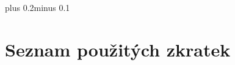 \documentclass[11pt,twoside,a4paper]{book}
\begin{document}

\mainbodystarts
\normalfont
{}\baselineskip plus 0.2\baselineskip minus 0.1\baselineskip



% 
% 









%



%
{
\def\CS{$\cal C\kern-0.1667em\lower.5ex\hbox{$\cal S$}\kern-0.075em $}

}

\appendix
\chapter{Seznam použitých zkratek}
\end{document}
